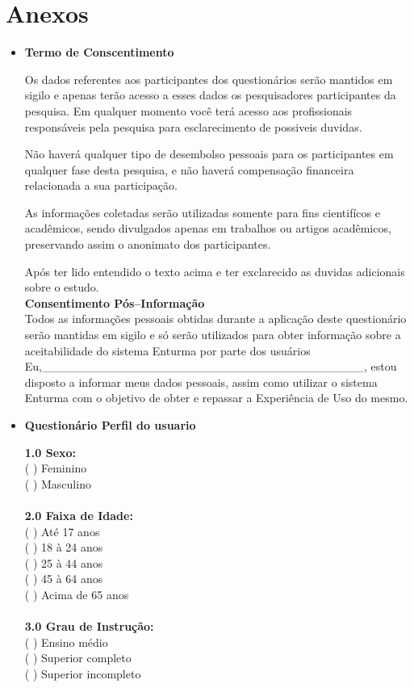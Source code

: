 \chapter*{Anexos}

\begin{itemize}

	\item \textbf{Termo de Conscentimento}

		Os dados referentes aos participantes dos questionários serão mantidos em sigilo e apenas terão acesso a esses dados os pesquisadores participantes da pesquisa.	
		Em qualquer momento você terá acesso aos profissionais responsáveis pela pesquisa para esclarecimento de possiveis duvidas.

		Não haverá qualquer tipo de desembolso pessoais para os participantes em qualquer fase desta pesquisa, e não haverá compensação financeira relacionada a sua participação.

		As informações coletadas serão utilizadas somente para fins cientifícos e acadêmicos, sendo divulgados apenas em trabalhos ou artigos acadêmicos, preservando assim o anonimato dos participantes.
			
		Após ter lido entendido o texto acima e ter exclarecido as duvidas adicionais sobre o estudo. \\


		\textbf{Consentimento Pós–Informação} \\

		Todos as informações pessoais obtidas durante a aplicação deste questionário serão mantidas em sigilo e só serão utilizados para obter informação sobre a aceitabilidade do sistema Enturma por parte dos usuários
		Eu,\_\_\_\_\_\_\_\_\_\_\_\_\_\_\_\_\_\_\_\_\_\_\_\_\_\_\_\_\_\_\_\_\_\_\_\_\_\_, estou disposto a informar meus dados pessoais, assim como utilizar o sistema Enturma com o objetivo de obter e repassar a Experiência de Uso do mesmo.



	\item \textbf{Questionário Perfil do usuario}


		\textbf{1.0 Sexo:}
			\\
			  ( ) Feminino \\
			  ( ) Masculino\\
			\\
		\textbf{2.0 Faixa de Idade:}
			\\
			  ( ) Até 17 anos\\
			  ( ) 18 à 24 anos\\
			  ( ) 25 à 44 anos\\
			  ( ) 45 à 64 anos\\
			  ( ) Acima de 65 anos\\
			\\
		\textbf{3.0 Grau de Instrução:}
			\\
			  ( ) Ensino médio\\
			  ( ) Superior completo\\
			  ( ) Superior incompleto\\
			\\


\end{itemize}
